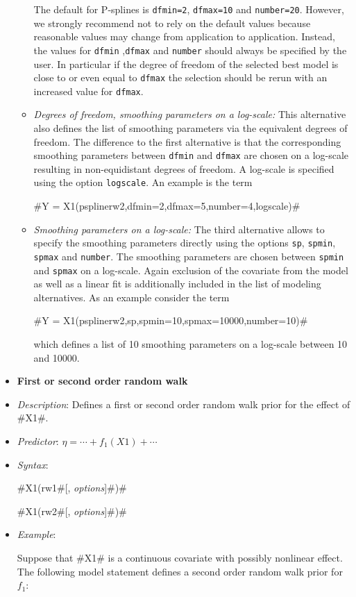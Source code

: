 \begin{itemize}
\begin{itemize}
The default for P-splines is {\tt dfmin=2}, {\tt dfmax=10} and {\tt number=20}. However, we strongly recommend not to rely on
the default values because reasonable values may change from application to application.
Instead, the values for {\tt dfmin} ,{\tt dfmax} and {\tt number} should always be specified by the user. In particular if the
degree of freedom of the selected best model is close to or even equal to {\tt dfmax} the selection should be rerun with an increased
value for {\tt dfmax}.
\item {\em Degrees of freedom, smoothing parameters on a log-scale:}
This alternative  also defines the list of smoothing parameters via the equivalent degrees of freedom. The difference to the
first alternative is that the corresponding smoothing parameters between {\tt dfmin} and {\tt dfmax}  are chosen on a log-scale resulting
in non-equidistant degrees of freedom. A log-scale is specified using the option {\tt logscale}. An example is the term

#Y = X1(psplinerw2,dfmin=2,dfmax=5,number=4,logscale)#

\item {\em Smoothing parameters on a log-scale:}
The third alternative allows to specify the smoothing parameters directly using the options {\tt sp}, {\tt spmin}, {\tt spmax}
and {\tt number}. The smoothing parameters are chosen between {\tt spmin} and {\tt spmax} on a log-scale. Again exclusion of the covariate from the
model as well as a linear fit is additionally included in the list of modeling alternatives. As an example consider the term

#Y = X1(psplinerw2,sp,spmin=10,spmax=10000,number=10)#

which defines a list of 10 smoothing parameters on a log-scale between 10 and 10000.
\end{itemize}
\item[]{\bf\sffamily First or second order random walk}

\item[] {\em Description}: Defines a first or second order random walk prior for the effect of #X1#.
\item[] {\em Predictor}: $\eta = \cdots + f_1(X1) + \cdots $
\item[] {\em Syntax}:

#X1(rw1#[, {\em options}]#)#

#X1(rw2#[, {\em options}]#)#
\item[] {\em Example}:

Suppose that #X1# is a continuous covariate with possibly
nonlinear effect. The following model statement defines a second
order random walk prior for $f_1$:


\end{itemize}

